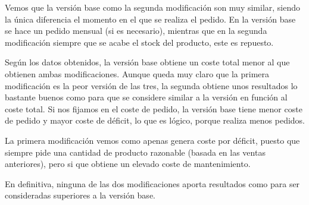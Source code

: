Vemos que la versión base como la segunda modificación son muy similar, siendo la única diferencia el momento en el que se realiza el pedido. En la versión base se hace un pedido mensual (si es necesario), mientras que en la segunda modificación siempre que se acabe el stock del producto, este es repuesto.

Según los datos obtenidos, la versión base obtiene un coste total menor al que obtienen ambas modificaciones. Aunque queda muy claro que la primera modificación es la peor versión de las tres, la segunda obtiene unos resultados lo bastante buenos como para que se considere similar a la versión en función al coste total. Si nos fijamos en el coste de pedido, la versión base tiene menor coste de pedido y mayor coste de déficit, lo que es lógico, porque realiza menos pedidos.

La primera modificación vemos como apenas genera coste por déficit, puesto que siempre pide una cantidad de producto razonable (basada en las ventas anteriores), pero si que obtiene un elevado coste de mantenimiento.

En definitiva, ninguna de las dos modificaciones aporta resultados como para ser consideradas superiores a la versión base.
